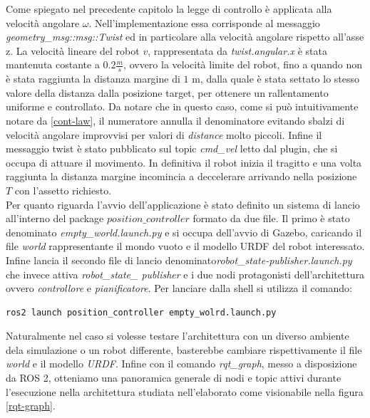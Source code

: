 \documentclass[a4paper,11 pt,oneside]{book}
\theoremstyle{definition}
\begin{document}
Come spiegato nel precedente capitolo la legge di controllo è applicata alla velocità angolare $\omega$. Nell'implementazione essa corrisponde al messaggio \emph{geometry_msg::msg::Twist} ed in particolare alla velocità angolare rispetto all'asse z.
La velocità lineare del robot $v$, rappresentata da \emph{twist.angular.x} è stata mantenuta costante a $0.2\frac{m}{s}$, ovvero la velocità limite del robot, fino a quando non è stata raggiunta la distanza margine di $1$ m, dalla quale è stata settato lo stesso valore della distanza dalla posizione target, per ottenere un rallentamento uniforme e controllato. Da notare che in questo caso, come si può intuitivamente notare da \eqref{cont-law}, il numeratore annulla il denominatore evitando sbalzi di velocità angolare improvvisi per valori di \emph{distance} molto piccoli. 
Infine il messaggio twist è stato pubblicato sul topic \emph{cmd_vel} letto dal plugin, che si occupa di attuare il movimento.
In definitiva il robot inizia il tragitto e una volta raggiunta la distanza margine incomincia a deccelerare arrivando nella posizione $T$ con l'assetto richiesto.
\\
Per quanto riguarda l'avvio dell'applicazione è stato definito un sistema di lancio all'interno del package $position\_controller$ formato da due file. Il primo è stato denominato  \emph{empty_world.launch.py} e si occupa dell'avvio di Gazebo, caricando il file \emph{world} rappresentante il mondo vuoto e il modello URDF del robot interessato. Infine lancia il secondo file di lancio denominato\emph{robot_state-publisher.launch.py} che invece attiva \emph{robot_state_ publisher} e i due nodi protagonisti dell'architettura ovvero \emph{controllore} e \emph{pianificatore}.
Per lanciare dalla shell si utilizza il comando:
\begin{lstlisting}
ros2 launch position_controller empty_wolrd.launch.py
\end{lstlisting}
Naturalmente nel caso si volesse testare l'architettura con un diverso ambiente dela simulazione o un robot differente, basterebbe cambiare rispettivamente il file \emph{world} e il modello \emph{URDF}.
Infine con il comando \emph{rqt_graph}, messo a disposizione da ROS 2, otteniamo una panoramica generale di nodi e topic attivi durante l'esecuzione nella architettura studiata nell'elaborato come visionabile nella figura \ref{rqt-graph}.
\end{document}
